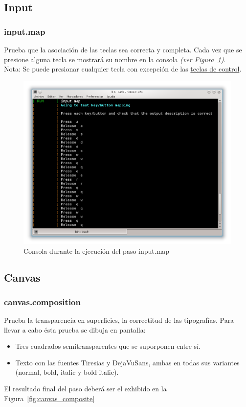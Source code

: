 \documentclass{article}
\begin{document}
\subsection{Input}
\label{sec:input_test}

\subsubsection{input.map}
Prueba que la asociación de las teclas sea correcta y completa. Cada vez que se presione alguna tecla se mostrará su nombre en la consola \textit{(ver Figura~\ref{fig:console})}.\\
Nota: Se puede presionar cualquier tecla con excepción de las \hyperref[sec:control_keys]{teclas de control}.

\begin{figure}[h]
\centering
\includegraphics[scale=0.45]{keys}
\caption{Consola durante la ejecución del paso input.map}
\label{fig:console}
\end{figure}

\FloatBarrier
\subsection{Canvas}
\label{sec:canvas_test}

\subsubsection{canvas.composition}
Prueba la transparencia en superficies, la correctitud de las tipografías. Para llevar a cabo ésta prueba se dibuja en pantalla:
\begin{itemize}
	\item Tres cuadrados semitransparentes que se suporponen entre sí.
	\item Texto con las fuentes Tiresias y DejaVuSans, ambas en todas sus variantes (normal, bold, italic y bold-italic).
\end{itemize}
El resultado final del paso deberá ser el exhibido en la Figura~\ref{fig:canvas_composite}
\end{document}
